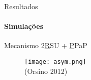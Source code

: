\documentclass[25pt,landscape]{beamer}
\begin{document}

\begin{frame}{Resultados}
	\framesubtitle{Simula\c{c}\~oes}
	\pause
	\begin{block}{Mecanismo}
		2\underline{R}SU + \underline{P}PaP
	\end{block}
	\begin{figure}[!h]
        \centering
        \texttt{[image: asym.png]} \\
        (Orsino 2012)
    \end{figure}
\end{frame}
\end{document}

